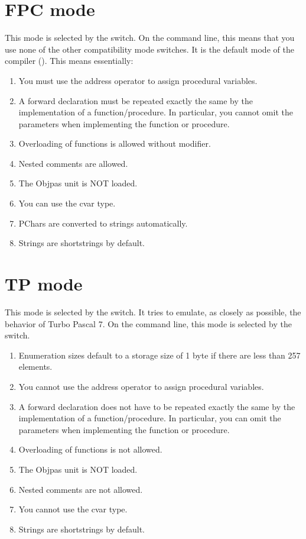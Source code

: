 \section{FPC mode}
This mode is selected by the  switch. On the command line,
this means that you use none of the other compatibility mode switches.
It is the default mode of the compiler (). This means essentially:
\begin{enumerate}
\item You must use the address operator to assign procedural variables.
\item A forward declaration must be repeated exactly the same by the
implementation of a function/procedure. In particular, you cannot omit the
parameters when implementing the function or procedure.
\item Overloading of functions is allowed without  modifier.
\item Nested comments are allowed.
\item The Objpas unit is NOT loaded.
\item You can use the cvar type.
\item PChars are converted to strings automatically.
\item Strings are shortstrings by default.
\end{enumerate}

\section{TP mode}
This mode is selected by the  switch. It tries to emulate, 
as closely as possible, the behavior of Turbo Pascal 7. On the command line,
this mode is selected by the  switch.

\begin{enumerate}
\item Enumeration sizes default to a storage size of 1 byte if there
are less than 257 elements.
\item You cannot use the address operator to assign procedural variables.
\item A forward declaration does not have to be repeated exactly the same by the
implementation of a function/procedure. In particular, you can omit the
parameters when implementing the function or procedure.
\item Overloading of functions is not allowed.
\item The Objpas unit is NOT loaded.
\item Nested comments are not allowed.
\item You cannot use the cvar type.
\item Strings are shortstrings by default.
\end{enumerate}

